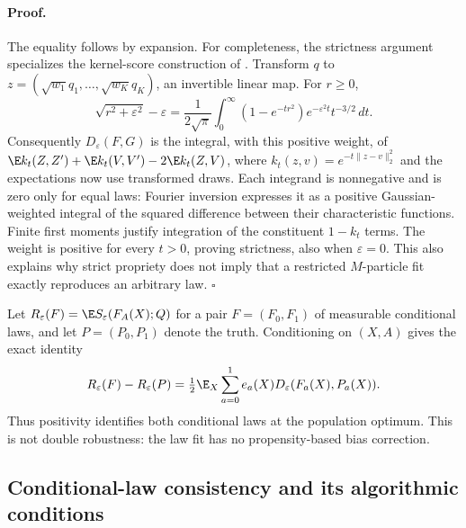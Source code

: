 \paragraph{Proof.}
The equality follows by expansion. For completeness, the strictness argument specializes the kernel-score construction of \citet[Section 5, Theorem 5]{gneiting2007proper}. Transform $q$ to $z=(\sqrt{w_1}q_1,\ldots,\sqrt{w_K}q_K)$, an invertible linear map. For $r\geq0$,
\[
 \sqrt{r^2+\varepsilon^2}-\varepsilon
 =\frac1{2\sqrt\pi}\int_0^\infty(1-e^{-tr^2})e^{-\varepsilon^2t}t^{-3/2}\,dt.
\]
Consequently $D_\varepsilon(F,G)$ is the integral, with this positive weight, of
$\E k_t(Z,Z')+\E k_t(V,V')-2\E k_t(Z,V)$, where $k_t(z,v)=e^{-t\|z-v\|_2^2}$ and the expectations now use transformed draws. Each integrand is nonnegative and is zero only for equal laws: Fourier inversion expresses it as a positive Gaussian-weighted integral of the squared difference between their characteristic functions. Finite first moments justify integration of the constituent $1-k_t$ terms. The weight is positive for every $t>0$, proving strictness, also when $\varepsilon=0$. This also explains why strict propriety does not imply that a restricted $M$-particle fit exactly reproduces an arbitrary law. $\square$

Let $R_\varepsilon(F)=\E S_\varepsilon(F_A(X);Q)$ for a pair $F=(F_0,F_1)$ of measurable conditional laws, and let $P=(P_0,P_1)$ denote the truth. Conditioning on $(X,A)$ gives the exact identity
\begin{equation}
 R_\varepsilon(F)-R_\varepsilon(P)
 =\tfrac12\E_X\sum_{a=0}^1 e_a(X)D_\varepsilon(F_a(X),P_a(X)).
 \label{eq:app-risk-id}
\end{equation}
Thus positivity identifies both conditional laws at the population optimum. This is not double robustness: the law fit has no propensity-based bias correction.

\subsection{Conditional-law consistency and its algorithmic conditions}

